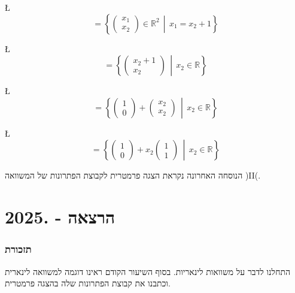 \documentclass[english,hebrew]{article}
\begin{document}
\L{%
\[
=\left\{ \begin{pmatrix}x_{1}\\
x_{2}
\end{pmatrix}\in\mathbb{R}^{2}\,\middle|\,x_{1}=x_{2}+1\right\} 
\]
}%

\L{%
\[
=\left\{ \begin{pmatrix}x_{2}+1\\
x_{2}
\end{pmatrix}\,\middle|\,x_{2}\in\mathbb{R}\right\} 
\]
}%

\L{%
\[
=\left\{ \begin{pmatrix}1\\
0
\end{pmatrix}+\begin{pmatrix}x_{2}\\
x_{2}
\end{pmatrix}\,\middle|\,x_{2}\in\mathbb{R}\right\} 
\]
}%

\L{%
\[
=\left\{ \begin{pmatrix}1\\
0
\end{pmatrix}+x_{2}\begin{pmatrix}1\\
1
\end{pmatrix}\,\middle|\,x_{2}\in\mathbb{R}\right\} 
\]
}%

הנוסחה האחרונה נקראת הצגה פרמטרית לקבוצת הפתרונות של המשוואה )II(.

\newpage{}

\noindent{}

\part{הרצאה {\endL} - {.2025\endL}}

\section{תזכורת}

התחלנו לדבר על משוואות לינאריות. בסוף השיעור הקודם ראינו דוגמה למשוואה
לינארית וכתבנו את קבוצת הפתרונות שלה בהצגה פרמטרית.
\end{document}
